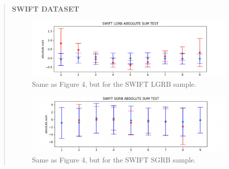\documentclass[12pt]{article}
\begin{document}
\begin{quote}
    \textbf{SWIFT DATASET}\\
    \begin{center}
    \begin{figure}
        \centering
        \includegraphics{SWIFT LGRB sum test.png}
        \caption{Same as Figure 4, but for the SWIFT LGRB sample.}
        \label{fig:enter-label}
    \end{figure}
    \begin{figure}
        \centering
        \includegraphics{SWIFT SGRB sum test.png}
        \caption{Same as Figure 4, but for the SWIFT SGRB sample.}
        \label{fig:enter-label}
    \end{figure}
    \end{center}
\end{quote}
\end{document}

